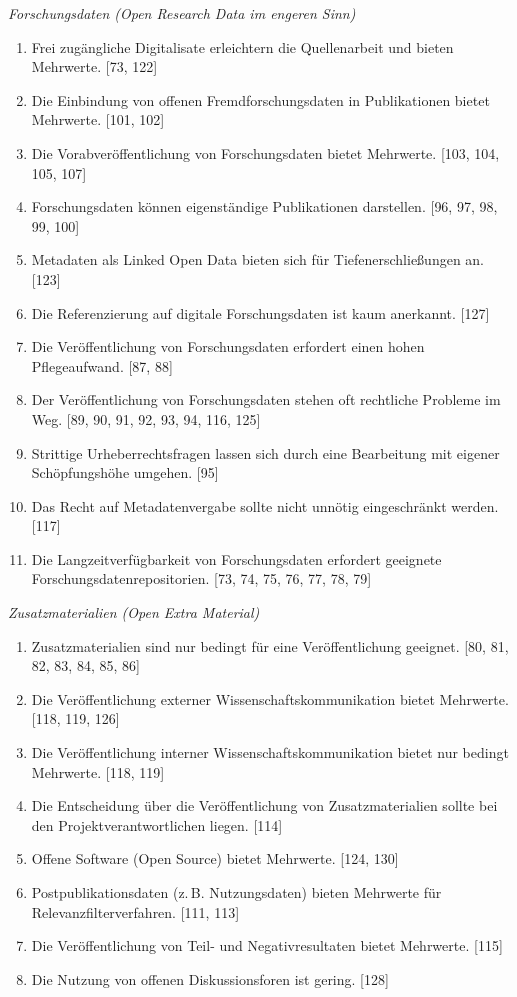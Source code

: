\documentclass[a4paper,
fontsize=11pt,
oneside,
numbers=noperiodatend,
parskip=half-,
bibliography=totoc,
final
]{scrartcl}
\begin{document}
\emph{Forschungsdaten (Open Research Data im engeren Sinn)}

\begin{enumerate}
\def\labelenumi{(\arabic{enumi})}
\item
  Frei zugängliche Digitalisate erleichtern die Quellenarbeit und bieten Mehrwerte. {[}73, 122{]}
\item
  Die Einbindung von offenen Fremdforschungsdaten in Publikationen bietet Mehrwerte. {[}101, 102{]}
\item
  Die Vorabveröffentlichung von Forschungsdaten bietet Mehrwerte. {[}103, 104, 105, 107{]}
\item
  Forschungsdaten können eigenständige Publikationen darstellen. {[}96, 97, 98, 99, 100{]}
\item
  Metadaten als Linked Open Data bieten sich für Tiefenerschließungen an. {[}123{]}
\item
  Die Referenzierung auf digitale Forschungsdaten ist kaum anerkannt. {[}127{]}
\item
  Die Veröffentlichung von Forschungsdaten erfordert einen hohen Pflegeaufwand. {[}87, 88{]}
\item
  Der Veröffentlichung von Forschungsdaten stehen oft rechtliche Probleme im Weg. {[}89, 90, 91, 92, 93, 94, 116, 125{]}
\item
  Strittige Urheberrechtsfragen lassen sich durch eine Bearbeitung mit eigener Schöpfungshöhe umgehen. {[}95{]}
\item
  Das Recht auf Metadatenvergabe sollte nicht unnötig eingeschränkt werden. {[}117{]}
\item
  Die Langzeitverfügbarkeit von Forschungsdaten erfordert geeignete Forschungsdatenrepositorien. {[}73, 74, 75, 76, 77, 78,
  79{]}
\end{enumerate}

\emph{Zusatzmaterialien (Open Extra Material)}

\begin{enumerate}
\def\labelenumi{(\arabic{enumi})}
\item
  Zusatzmaterialien sind nur bedingt für eine Veröffentlichung geeignet. {[}80, 81, 82, 83, 84, 85, 86{]}
\item
  Die Veröffentlichung externer Wissenschaftskommunikation bietet Mehrwerte. {[}118, 119, 126{]}
\item
  Die Veröffentlichung interner Wissenschaftskommunikation bietet nur bedingt Mehrwerte. {[}118, 119{]}
\item
  Die Entscheidung über die Veröffentlichung von Zusatzmaterialien sollte bei den Projektverantwortlichen liegen.
  {[}114{]}
\item
  Offene Software (Open Source) bietet Mehrwerte. {[}124, 130{]}
\item
  Postpublikationsdaten (z.\,B. Nutzungsdaten) bieten Mehrwerte für Relevanzfilterverfahren. {[}111, 113{]}
\item
  Die Veröffentlichung von Teil- und Negativresultaten bietet Mehrwerte. {[}115{]}
\item
  Die Nutzung von offenen Diskussionsforen ist gering. {[}128{]}
\end{enumerate}
\end{document}
